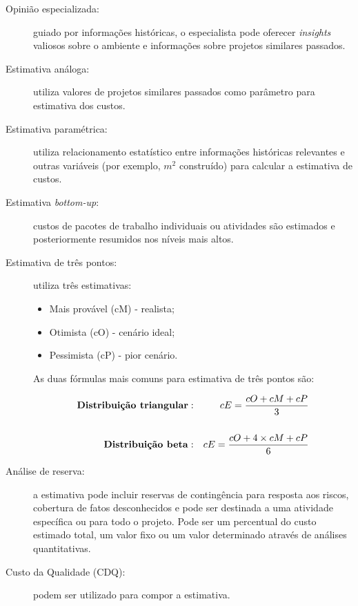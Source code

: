 \begin{description}
	
	\item[Opinião especializada:] guiado por informações históricas, o especialista pode oferecer \textit{insights} valiosos sobre o ambiente e informações sobre projetos similares passados.
	
	\item[Estimativa análoga:] utiliza valores de projetos similares passados como parâmetro para estimativa dos custos.
	
	\item[Estimativa paramétrica:] utiliza relacionamento estatístico entre informações históricas relevantes e outras variáveis (por exemplo, $m^2$ construído) para calcular a estimativa de custos.
	
	\item[Estimativa \textit{bottom-up}:] custos de pacotes de trabalho individuais ou atividades são estimados e posteriormente resumidos nos níveis mais altos.
	
	\item[Estimativa de três pontos:] utiliza três estimativas:
	
		\begin{itemize}
			\item Mais provável (cM) - realista;
			\item Otimista (cO) - cenário ideal;
			\item Pessimista (cP) - pior cenário.		
		\end{itemize}
		
	As duas fórmulas mais comuns para estimativa de três pontos são:
	
		\begin{eqnarray*}
			\text{\textbf{Distribuição triangular}}&:&cE=\frac{cO+cM+cP}{3}\\	
			&&\\	
			\text{\textbf{Distribuição beta}}&:&cE=\frac{cO+4 \times cM+cP}{6}
		\end{eqnarray*}
		
	\item[Análise de reserva:] a estimativa pode incluir reservas de contingência para resposta aos riscos, cobertura de fatos desconhecidos e pode ser destinada a uma atividade específica ou para todo o projeto. Pode ser um percentual do custo estimado total, um valor fixo ou um valor determinado através de análises quantitativas.
	
	\item[Custo da Qualidade (CDQ):] podem ser utilizado para compor a estimativa.
	

\end{description}
